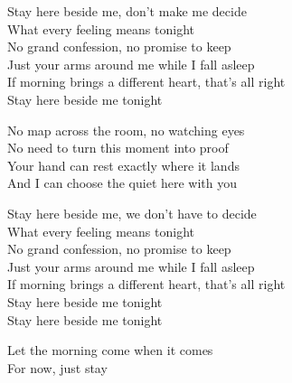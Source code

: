 \begin{lyrics}
Stay here beside me, don't make me decide\\
What every feeling means tonight\\
No grand confession, no promise to keep\\
Just your arms around me while I fall asleep\\
If morning brings a different heart, that's all right\\
Stay here beside me tonight

No map across the room, no watching eyes\\
No need to turn this moment into proof\\
Your hand can rest exactly where it lands\\
And I can choose the quiet here with you

Stay here beside me, we don't have to decide\\
What every feeling means tonight\\
No grand confession, no promise to keep\\
Just your arms around me while I fall asleep\\
If morning brings a different heart, that's all right\\
Stay here beside me tonight\\
Stay here beside me tonight

Let the morning come when it comes
\\
For now, just stay
\end{lyrics}

